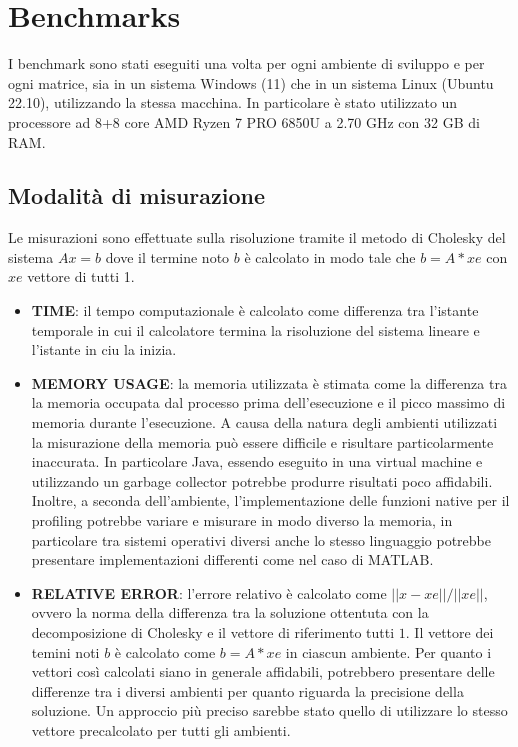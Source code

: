 \documentclass[a4paper, 12pt]{article}
\begin{document}
\section{Benchmarks}
I benchmark sono stati eseguiti una volta per ogni ambiente di sviluppo e per
ogni matrice, sia in un sistema Windows (11) che in un sistema Linux (Ubuntu
22.10), utilizzando la stessa macchina. In particolare è stato utilizzato un
processore ad 8+8 core AMD Ryzen 7 PRO 6850U a 2.70 GHz con 32 GB di RAM.

\subsection{Modalità di misurazione}
Le misurazioni sono effettuate sulla risoluzione tramite il metodo di Cholesky
del sistema $Ax = b$ dove il termine noto $b$ è calcolato in modo tale che
$b = A*xe$ con $xe$ vettore di tutti 1.

\begin{itemize}
  \item \textbf{TIME}: il tempo computazionale è calcolato come differenza tra
  l'istante temporale in cui il calcolatore termina la risoluzione del sistema
  lineare e l'istante in ciu la inizia.

  \item \textbf{MEMORY USAGE}: la memoria utilizzata è stimata come la
  differenza tra la memoria occupata dal processo prima dell'esecuzione e il
  picco massimo di memoria durante l'esecuzione.
  A causa della natura degli ambienti utilizzati la misurazione della memoria
  può essere difficile e risultare particolarmente inaccurata.
  In particolare Java, essendo eseguito in una virtual machine e utilizzando un
  garbage collector potrebbe produrre risultati poco affidabili.\\
  Inoltre, a seconda dell'ambiente, l'implementazione delle funzioni native per
  il profiling potrebbe variare e misurare in modo diverso la memoria, in
  particolare tra sistemi operativi diversi anche lo stesso linguaggio potrebbe
  presentare implementazioni differenti come nel caso di MATLAB.

  \item \textbf{RELATIVE ERROR}: l'errore relativo è calcolato come
  $||x-xe||/||xe||$, ovvero la norma della differenza tra la soluzione ottentuta
  con la decomposizione di Cholesky e il vettore di riferimento tutti $1$.
  Il vettore dei temini noti $b$ è calcolato come $b = A*xe$ in ciascun
  ambiente. Per quanto i vettori così calcolati siano in generale affidabili,
  potrebbero presentare delle differenze tra i diversi ambienti per quanto
  riguarda la precisione della soluzione. Un approccio più preciso sarebbe stato
  quello di utilizzare lo stesso vettore precalcolato per tutti gli ambienti.
\end{itemize}
\end{document}
